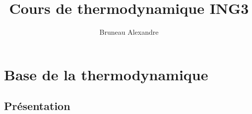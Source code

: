 \documentclass[a4paper,10pt]{article}
\title{Cours de thermodynamique ING3}
\author{Bruneau Alexandre}
\begin{document}
\maketitle

\begin{abstract}

\end{abstract}
\chapter{Base de la thermodynamique}
\section{Présentation}
\end{document}
